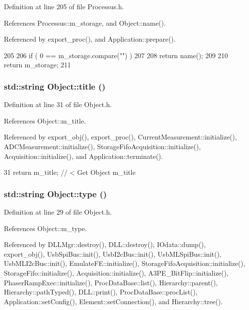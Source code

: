 Definition at line 205 of file Processus.h.

References Processus::m\_\-storage, and Object::name().

Referenced by export\_\-proc(), and Application::prepare().


\begin{DoxyCode}
205                        {
206     if ( 0 == m_storage.compare("") )
207     {
208       return name();
209     }
210     return m_storage;
211   }
\end{DoxyCode}
\hypertarget{classObject_a73a0f1a41828fdd8303dd662446fb6c3}{
\subsubsection[{title}]{\setlength{\rightskip}{0pt plus 5cm}std::string Object::title ()}}
\label{classObject_a73a0f1a41828fdd8303dd662446fb6c3}


Definition at line 31 of file Object.h.

References Object::m\_\-title.

Referenced by export\_\-obj(), export\_\-proc(), CurrentMeasurement::initialize(), ADCMeasurement::initialize(), StorageFifoAcquisition::initialize(), Acquisition::initialize(), and Application::terminate().


\begin{DoxyCode}
31 { return m_title;      } // < Get Object m_title
\end{DoxyCode}
\hypertarget{classObject_a84f99f70f144a83e1582d1d0f84e4e62}{
\subsubsection[{type}]{\setlength{\rightskip}{0pt plus 5cm}std::string Object::type ()}}
\label{classObject_a84f99f70f144a83e1582d1d0f84e4e62}


Definition at line 29 of file Object.h.

References Object::m\_\-type.

Referenced by DLLMgr::destroy(), DLL::destroy(), IOdata::dump(), export\_\-obj(), UsbSpiBus::init(), UsbI2cBus::init(), UsbMLSpiBus::init(), UsbMLI2cBus::init(), EmulateFE::initialize(), StorageFifoAcquisition::initialize(), StorageFifo::initialize(), Acquisition::initialize(), A3PE\_\-BitFlip::initialize(), PhaserRampExec::initialize(), ProcDataBase::list(), Hierarchy::parent(), Hierarchy::pathTyped(), DLL::print(), ProcDataBase::procList(), Application::setConfig(), Element::setConnection(), and Hierarchy::tree().



